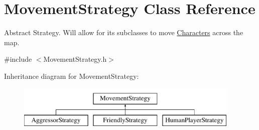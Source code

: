 \hypertarget{class_movement_strategy}{}\section{Movement\+Strategy Class Reference}
\label{class_movement_strategy}


Abstract Strategy. Will allow for its subclasses to move \hyperlink{class_characters}{Characters} across the map.  




{\ttfamily \#include $<$Movement\+Strategy.\+h$>$}

Inheritance diagram for Movement\+Strategy\+:\begin{figure}[H]
\begin{center}
\leavevmode
\includegraphics[height=2.000000cm]{class_movement_strategy}
\end{center}
\end{figure}
